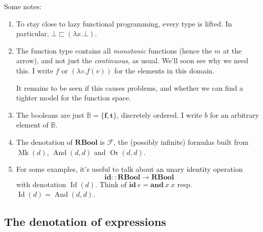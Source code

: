 \documentclass[manuscript,screen,acmsmall,nonacm]{acmart}
\newcommand{\syntax}[1]{\mathbf{#1}}
\newcommand{\tRBool}{\syntax{RBool}}
\newcommand{\sAnd}{\syntax{and}}
\newcommand{\sId}{\syntax{id}}
\newcommand{\dBool}{\mathbb B}
\newcommand{\dFalse}{\mathbf{f}}
\newcommand{\dTrue}{\mathbf{t}}
\newcommand{\dRBool}{\mathcal F}
\newcommand{\dlambda}{\mathit{\lambda}}
\newcommand{\dMk}{\operatorname{Mk}}
\newcommand{\dAnd}{\operatorname{And}}
\newcommand{\dId}{\operatorname{Id}}
\newcommand{\dOr}{\operatorname{Or}}
\begin{document}
Some notes:
\begin{enumerate}
\item To stay close to lazy functional programming, every type is lifted. In particular, $\bot \sqsubset (\dlambda x.\bot)$.

\item The function type contains all \emph{monotonic} functions (hence the $m$ at the arrow), and not just the \emph{continuous}, as usual. We’ll soon see why we need this.
I write $f$ or $(\dlambda v. f(v))$ for the elements in this domain.

It remains to be seen if this causes problems, and whether we can find a tighter model for the function space.

\item The booleans are just $\dBool = \{\dFalse, \dTrue\}$, discretely ordered. I write $b$ for an arbitrary element of $\dBool$.

\item The denotation of $\tRBool$ is $\dRBool$, the (possibly infinite) formulas  built from $\dMk(d)$, $\dAnd(d,d)$ and $\dOr(d,d)$.

\item For some examples, it's useful to talk about an unary identity operation
\[
\sId :: \tRBool \to \tRBool
\]
with denotation $\dId(d)$. Think of $\sId~e = \sAnd~x~x$ resp. $\dId(d)=\dAnd(d,d)$.

\end{enumerate}

\subsection{The denotation of expressions}\label{sec:denotation}
\end{document}
